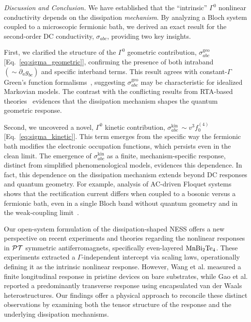 \documentclass[twocolumn, prx, reprint, amsfonts, amsmath, amssymb, longbibliography, floatfix, aps]{revtex4-2}
\begin{document}
\medskip

\textit{\color{blue}Discussion and Conclusion.} We have established that the ``intrinsic'' $\Gamma^0$ nonlinear conductivity depends on the dissipation {\it mechanism}. 
By analyzing a Bloch system coupled to a microscopic fermionic bath, we derived an exact result for the second-order DC conductivity, $\sigma_{a b c}$, providing two key insights.

First, we clarified the structure of the $\Gamma^0$ geometric contribution, $\sigma_{a b c}^{\text{geo}}$ [Eq.~\eqref{eq:sigma_geometric}], confirming the presence of both intraband $(\sim \partial_a g_{b c})$ and specific interband terms. 
This result agrees with constant-$\Gamma$ Green's function formalisms~\cite{ulrich2025quantum}, suggesting $\sigma_{a b c}^{\text{geo}}$ may be characteristic for idealized Markovian models. 
The contrast with the conflicting results from RTA-based theories~\cite{das2023intrinsic,kaplan2024unification,qiang2025clarification} evidences that the dissipation mechanism shapes the quantum geometric response.

Second, we uncovered a novel, $\Gamma^0$ kinetic contribution, $\sigma_{a b c}^{\text {kin }} \sim v^3 f_0^{(4)}$ [Eq.~\eqref{eq:sigma_kinetic}]. 
This term emerges from the specific way the fermionic bath modifies the electronic occupation functions, which persists even in the clean limit.
The emergence of $\sigma_{a b c}^{\text{kin}}$ as a finite, mechanism-specific response, distinct from simplified phenomenological models, evidences this dependence. 
In fact, this dependence on the dissipation mechanism extends beyond DC responses and quantum geometry. 
For example, analysis of AC-driven Floquet systems shows that the rectification current differs when coupled to a bosonic versus a fermionic bath, even in a single Bloch band without quantum geometry and in the weak-coupling limit~\cite{shi2025ultracritical}.

Our open-system formulation of the dissipation-shaped NESS offers a new perspective on recent experiments and theories regarding the nonlinear responses in ${\cal P} {\cal T}$ symmetric antiferromagnets, specifically even-layered ${\rm MnBi}_2 {\rm Te}_4$\cite{gao2024antiferromagnetic, wang2023quantum, gao2023quantum}. These experiments extracted a $\Gamma$-independent intercept via scaling laws, operationally defining it as the intrinsic nonlinear response. However, Wang et al. \cite{wang2023quantum} measured a finite longitudinal response in pristine devices on bare substrates, while Gao et al. \cite{gao2023quantum,gao2024antiferromagnetic} reported a predominantly transverse response using encapsulated van der Waals heterostructures. Our findings offer a physical approach to reconcile these distinct observations by examining both the tensor structure of the response and the underlying dissipation mechanisms.
\end{document}
